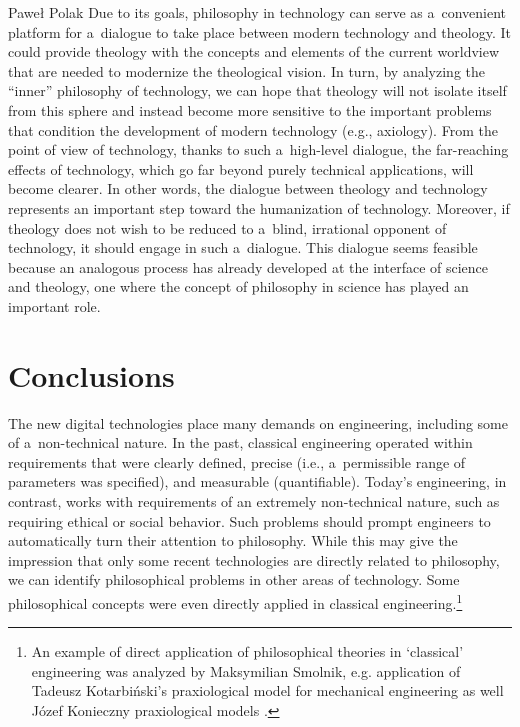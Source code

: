 \begin{artengenv}{Paweł Polak}
Due to its goals, philosophy in technology can serve as a~convenient platform for a~dialogue to take place between modern technology and theology. It could provide theology with the concepts and elements of the current worldview that are needed to modernize the theological vision. In turn, by analyzing the ``inner'' philosophy of technology, we can hope that theology will not isolate itself from this sphere and instead become more sensitive to the important problems that condition the development of modern technology (e.g., axiology). From the point of view of technology, thanks to such a~high-level dialogue, the far-reaching effects of technology, which go far beyond purely technical applications, will become clearer. In other words, the dialogue between theology and technology represents an important step toward the humanization of technology. Moreover, if theology does not wish to be reduced to a~blind, irrational opponent of technology, it should engage in such a~dialogue. This dialogue seems feasible because an analogous process has already developed at the interface of science and theology, one where the concept of philosophy in science has played an important role.



\section{Conclusions}

The new digital technologies place many demands on engineering, including some of a~non-technical nature. In the past, classical engineering operated within requirements that were clearly defined, precise (i.e., a~permissible range of parameters was specified), and measurable (quantifiable). Today's engineering, in contrast, works with requirements of an extremely non-technical nature, such as requiring ethical or social behavior. Such problems should prompt engineers to automatically turn their attention to philosophy. While this may give the impression that only some recent technologies are directly related to philosophy, we can identify philosophical problems in other areas of technology. Some philosophical concepts were even directly applied in classical engineering.\footnote{An example of direct application of philosophical theories in ‘classical' engineering was analyzed by Maksymilian Smolnik, e.g. application of Tadeusz Kotarbiński's praxiological model for mechanical engineering 
\parencite[][]{smolnik_praxiological_2018} %
 as well Józef Konieczny praxiological models 
\parencite[][]{smolnik_comparative_2017}.%
}




\end{artengenv}
